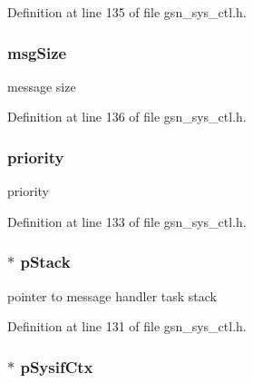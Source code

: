 Definition at line 135 of file gsn\_\-sys\_\-ctl.h.

\hypertarget{a00249_aafd0a2e6e8c7d8ff4ee52626581abe6f}{
\subsubsection[{msgSize}]{ {\bf msgSize}}}
\label{a00249_aafd0a2e6e8c7d8ff4ee52626581abe6f}
message size 

Definition at line 136 of file gsn\_\-sys\_\-ctl.h.

\hypertarget{a00249_a4eb2b736accd00141e11004adc0fded0}{
\subsubsection[{priority}]{ {\bf priority}}}
\label{a00249_a4eb2b736accd00141e11004adc0fded0}
priority 

Definition at line 133 of file gsn\_\-sys\_\-ctl.h.

\hypertarget{a00249_a06dc12db7ec3c52d8dc551e9e8f77e63}{
\subsubsection[{pStack}]{$\ast$ {\bf pStack}}}
\label{a00249_a06dc12db7ec3c52d8dc551e9e8f77e63}
pointer to message handler task stack 

Definition at line 131 of file gsn\_\-sys\_\-ctl.h.

\hypertarget{a00249_a48d2f968a8bd5038d7077bf2e4384997}{
\subsubsection[{pSysifCtx}]{$\ast$ {\bf pSysifCtx}}}
\label{a00249_a48d2f968a8bd5038d7077bf2e4384997}


